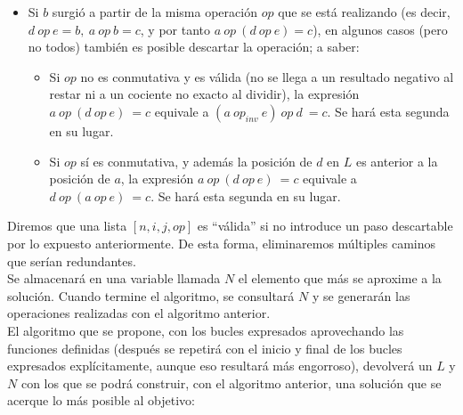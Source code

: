 \begin{itemize}
	\item Si $b$ surgió a partir de la misma operación $op$ que se está realizando
	(es decir, $d\ op\ e = b,\ a\ op\ b = c$, y por tanto $a\ op\ (d\ op\ e) = c$),
	 en algunos casos (pero no todos) también es posible descartar la operación;
	 a saber:
	\begin{itemize}
		\item Si $op$ no es conmutativa y es válida (no se llega a un resultado
		negativo al restar ni a un cociente no exacto al dividir), la expresión
		$a\ op\ (d\ op\ e)\ = c$ equivale a $(a\ op_{inv}\ e)\ op\ d\ = c$.
		Se hará esta segunda en su lugar.
		\item Si $op$ sí es conmutativa, y además la posición de $d$ en $L$ es
		anterior a la posición de $a$, la expresión $a\ op\ (d\ op\ e)\ = c$
		equivale a $d\ op\ (a\ op\ e)\ = c$. Se hará esta segunda en su lugar.
	\end{itemize}
\end{itemize}

Diremos que una lista $[n, i, j, op]$ es ``válida'' si no introduce un paso
descartable por lo expuesto anteriormente. De esta forma, eliminaremos múltiples
 caminos que serían redundantes.\\

Se almacenará en una variable llamada $N$ el elemento que más se aproxime a la
solución. Cuando termine el algoritmo, se consultará $N$ y se generarán las
operaciones realizadas con el algoritmo anterior. \\


El algoritmo que se propone, con los bucles expresados aprovechando las
funciones definidas (después se repetirá con el inicio y final de los bucles
expresados explícitamente, aunque eso resultará más engorroso), devolverá un
$L$ y $N$ con los que se podrá construir, con el algoritmo anterior, una
solución que se acerque lo más posible al objetivo:\\

